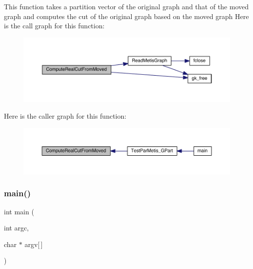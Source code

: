 This function takes a partition vector of the original graph and that of the moved graph and computes the cut of the original graph based on the moved graph Here is the call graph for this function\+:\nopagebreak
\begin{figure}[H]
\begin{center}
\leavevmode
\includegraphics[width=350pt]{a00437_a8003a74d9258bf251cc16e3b964c4b69_cgraph}
\end{center}
\end{figure}
Here is the caller graph for this function\+:\nopagebreak
\begin{figure}[H]
\begin{center}
\leavevmode
\includegraphics[width=350pt]{a00437_a8003a74d9258bf251cc16e3b964c4b69_icgraph}
\end{center}
\end{figure}
\mbox{\label{a00437_a0ddf1224851353fc92bfbff6f499fa97}} 
\subsubsection{\texorpdfstring{main()}{main()}}
{\footnotesize\ttfamily int main (\begin{DoxyParamCaption}\item[{int}]{argc,  }\item[{char $\ast$}]{argv\mbox{[}$\,$\mbox{]} }\end{DoxyParamCaption})}

